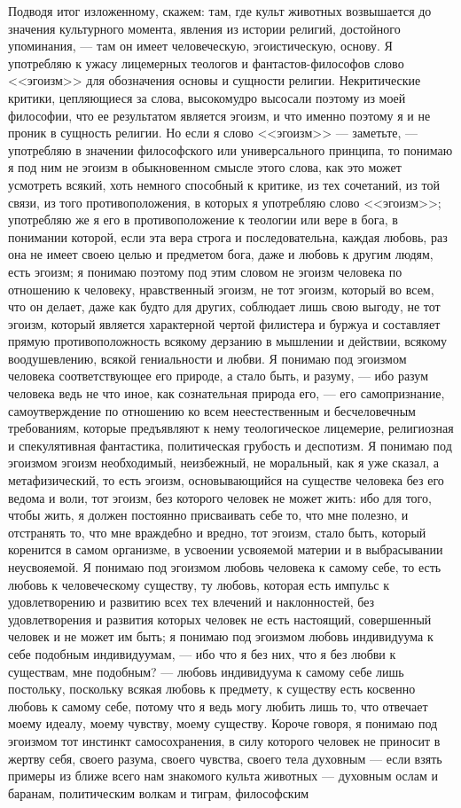 \documentclass[12pt]{article}
\begin{document}
Подводя итог изложенному, скажем: там, где культ животных возвышается до значения культурного момента, явления из истории религий, достойного упоминания, --- там он имеет человеческую, эгоистическую, основу. Я употребляю к ужасу лицемерных теологов и фантастов-философов слово <<эгоизм>> для обозначения основы и сущности религии. Некритические критики, цепляющиеся за слова, высокомудро высосали поэтому из моей философии, что ее результатом является эгоизм, и что именно поэтому я и не проник в сущность религии. Но если я слово <<эгоизм>>  --- заметьте, --- употребляю в значении философского или универсального принципа, то понимаю я под ним не эгоизм в обыкновенном смысле этого слова, как это может усмотреть всякий, хоть немного способный к критике, из тех сочетаний, из той связи, из того противоположения, в которых я употребляю слово <<эгоизм>>; употребляю же я его в противоположение к теологии или вере в бога, в понимании которой, если эта вера строга и последовательна, каждая любовь, раз она не имеет своею целью и предметом бога, даже и любовь к другим людям, есть эгоизм; я понимаю поэтому под этим словом не эгоизм человека по отношению к человеку, нравственный эгоизм, не тот эгоизм, который во всем, что он делает, даже как будто для других, соблюдает лишь свою выгоду, не тот эгоизм, который является характерной чертой филистера и буржуа и составляет прямую противоположность всякому дерзанию в мышлении и действии, всякому воодушевлению, всякой гениальности и любви. Я понимаю под эгоизмом человека соответствующее его природе, а стало быть, и разуму, --- ибо разум человека ведь не что иное, как сознательная природа его, --- его самопризнание, самоутверждение по отношению ко всем неестественным и бесчеловечным требованиям, которые предъявляют к нему теологическое лицемерие, религиозная и спекулятивная фантастика, политическая грубость и деспотизм. Я понимаю под эгоизмом эгоизм необходимый, неизбежный, не моральный, как я уже сказал, а метафизический, то есть эгоизм, основывающийся на существе человека без его ведома и воли, тот эгоизм, без которого человек не может жить: ибо для того, чтобы жить, я должен постоянно присваивать себе то, что мне полезно, и отстранять то, что мне враждебно и вредно, тот эгоизм, стало быть, который коренится в самом организме, в усвоении усвояемой материи и в выбрасывании неусвояемой. Я понимаю под эгоизмом любовь человека к самому себе, то есть любовь к человеческому существу, ту любовь, которая есть импульс к удовлетворению и развитию всех тех влечений и наклонностей, без удовлетворения и развития которых человек не есть настоящий, совершенный человек и не может им быть; я понимаю под эгоизмом любовь индивидуума к себе подобным индивидуумам, --- ибо что я без них, что я без любви к существам, мне подобным? --- любовь индивидуума к самому себе лишь постольку, поскольку всякая любовь к предмету, к существу есть косвенно любовь к самому себе, потому что я ведь могу любить лишь то, что отвечает моему идеалу, моему чувству, моему существу. Короче говоря, я понимаю под эгоизмом тот инстинкт самосохранения, в силу которого человек не приносит в жертву себя, своего разума, своего чувства, своего тела духовным --- если взять примеры из ближе всего нам знакомого культа животных --- духовным ослам и баранам, политическим волкам и тиграм, философским 
\end{document}
